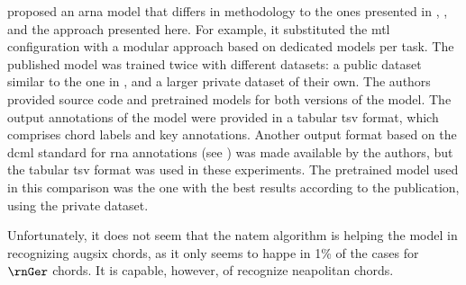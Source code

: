 
\textcite{mcleod2021modular} proposed an \gls{arna} model
that differs in methodology to the ones presented in
\textcite{chen2021attend}, \textcite{micchi2021deep}, and
the approach presented here. For example, it substituted the
\gls{mtl} configuration with a modular approach based on
dedicated models per task. The published model was trained
twice with different datasets: a public dataset similar to
the one in \textcite{micchi2021deep}, and a larger private
dataset of their own. The authors provided source code and
pretrained models for both versions of the model. The output
annotations of the model were provided in a tabular \gls{tsv}
format, which comprises chord labels and key annotations.
Another output format based on the \gls{dcml} standard for
\gls{rna} annotations (see )
was made available by the authors, but the tabular \gls{tsv}
format was used in these experiments. The pretrained model
used in this comparison was the one with the best results
according to the publication, using the private dataset.

Unfortunately, it does not seem that the \gls{natem}
algorithm is helping the \textcite{mcleod2021modular} model
in recognizing \gls{augsix} chords, as it only seems to
happe in 1\% of the cases for $\rnGer$ chords. It is
capable, however, of recognize \gls{neapolitan} chords.
